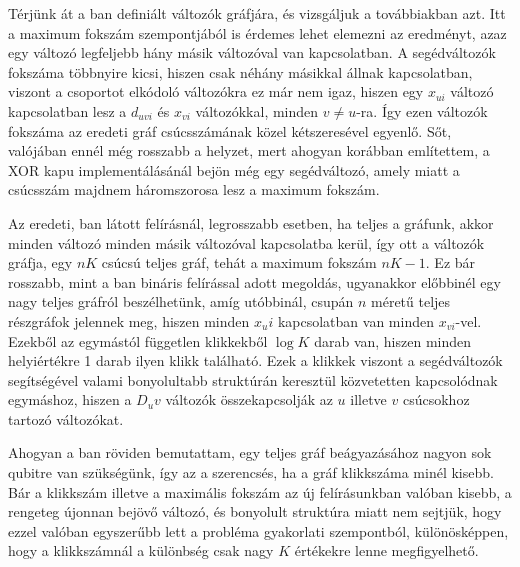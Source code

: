 Térjünk át a ban definiált változók gráfjára, és vizsgáljuk a továbbiakban azt.
Itt a maximum fokszám szempontjából is érdemes lehet elemezni az eredményt, azaz egy változó legfeljebb hány másik változóval van kapcsolatban. A segédváltozók fokszáma többnyire kicsi, hiszen csak néhány másikkal állnak kapcsolatban, viszont a csoportot elkódoló változókra ez már nem igaz, hiszen egy $x_{ui}$ változó kapcsolatban lesz a $d_{uvi}$ és $x_{vi}$ változókkal, minden $v \neq u$-ra. Így ezen változók fokszáma az eredeti gráf csúcsszámának közel kétszeresével egyenlő. Sőt, valójában ennél még rosszabb a helyzet, mert ahogyan korábban említettem, a XOR kapu implementálásánál bejön még egy segédváltozó, amely miatt a csúcsszám majdnem háromszorosa lesz a maximum fokszám.

%
%
%
%
%
%
%


 
Az eredeti, ban látott felírásnál, legrosszabb esetben, ha teljes a gráfunk, akkor minden változó minden másik változóval kapcsolatba kerül, így ott a változók gráfja, egy $nK$ csúcsú teljes gráf, tehát a maximum fokszám  $nK -1$. Ez bár rosszabb, mint a ban bináris felírással adott megoldás, ugyanakkor előbbinél egy nagy teljes gráfról beszélhetünk, amíg utóbbinál, csupán $n$ méretű teljes részgráfok jelennek meg, hiszen minden $x_ui$ kapcsolatban van minden $x_{vi}$-vel. Ezekből az egymástól független klikkekből $\log K$ darab van, hiszen minden helyiértékre 1 darab ilyen klikk található. Ezek a klikkek viszont a segédváltozók segítségével valami bonyolultabb struktúrán keresztül közvetetten kapcsolódnak egymáshoz, hiszen a $D_uv$ változók összekapcsolják az $u$ illetve $v$ csúcsokhoz tartozó változókat.

Ahogyan a ban röviden bemutattam, egy teljes gráf beágyazásához nagyon sok qubitre van szükségünk, így az a szerencsés, ha a gráf klikkszáma minél kisebb. Bár a klikkszám illetve a maximális fokszám az új felírásunkban valóban kisebb, a rengeteg újonnan bejövő változó, és bonyolult struktúra miatt nem sejtjük, hogy ezzel valóban egyszerűbb lett a probléma gyakorlati szempontból, különösképpen, hogy a klikkszámnál a különbség csak nagy $K$ értékekre lenne megfigyelhető.


